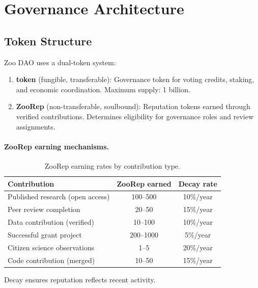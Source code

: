 \section{Governance Architecture}

\label{sec:architecture}

\subsection{Token Structure}

Zoo DAO uses a dual-token system:

\begin{enumerate}
  \item \textbf{\ZOO{} token} (fungible, transferable): Governance token
    for voting credits, staking, and economic coordination. Maximum
    supply: 1 billion.

  \item \textbf{ZooRep} (non-transferable, soulbound): Reputation tokens
    earned through verified contributions. Determines eligibility for
    governance roles and review assignments.
\end{enumerate}

\paragraph{ZooRep earning mechanisms.}
\begin{table}[H]
\centering
\caption{ZooRep earning rates by contribution type.}
\label{tab:rep}
\begin{tabular}{lcc}
\toprule
\textbf{Contribution} & \textbf{ZooRep earned} & \textbf{Decay rate} \\
\midrule
Published research (open access) & 100--500 & 10\%/year \\
Peer review completion & 20--50 & 15\%/year \\
Data contribution (verified) & 10--100 & 10\%/year \\
Successful grant project & 200--1000 & 5\%/year \\
Citizen science observations & 1--5 & 20\%/year \\
Code contribution (merged) & 10--50 & 15\%/year \\
\bottomrule
\end{tabular}
\end{table}

Decay ensures reputation reflects recent activity.

